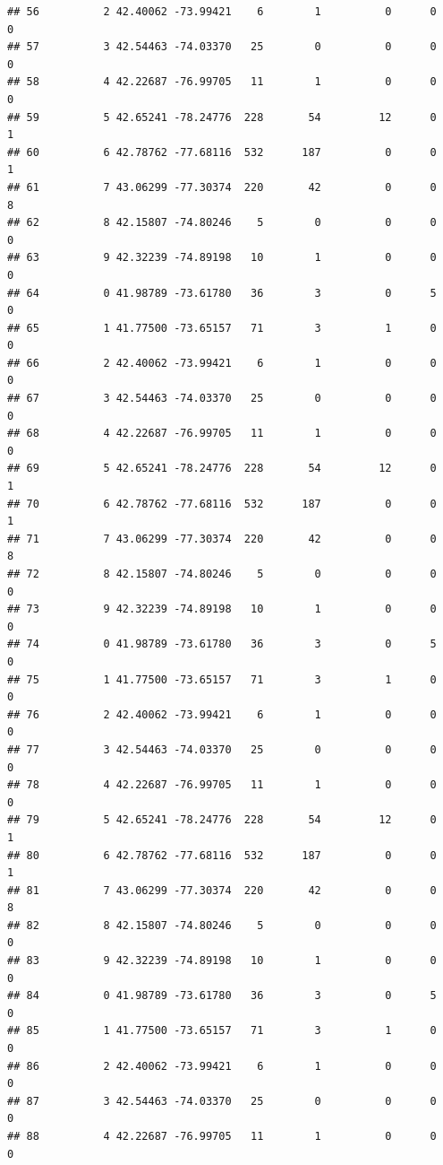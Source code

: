 \documentclass[
]{article}
\begin{document}
\begin{verbatim}
## 56          2 42.40062 -73.99421    6        1          0      0            0
## 57          3 42.54463 -74.03370   25        0          0      0            0
## 58          4 42.22687 -76.99705   11        1          0      0            0
## 59          5 42.65241 -78.24776  228       54         12      0            1
## 60          6 42.78762 -77.68116  532      187          0      0            1
## 61          7 43.06299 -77.30374  220       42          0      0            8
## 62          8 42.15807 -74.80246    5        0          0      0            0
## 63          9 42.32239 -74.89198   10        1          0      0            0
## 64          0 41.98789 -73.61780   36        3          0      5            0
## 65          1 41.77500 -73.65157   71        3          1      0            0
## 66          2 42.40062 -73.99421    6        1          0      0            0
## 67          3 42.54463 -74.03370   25        0          0      0            0
## 68          4 42.22687 -76.99705   11        1          0      0            0
## 69          5 42.65241 -78.24776  228       54         12      0            1
## 70          6 42.78762 -77.68116  532      187          0      0            1
## 71          7 43.06299 -77.30374  220       42          0      0            8
## 72          8 42.15807 -74.80246    5        0          0      0            0
## 73          9 42.32239 -74.89198   10        1          0      0            0
## 74          0 41.98789 -73.61780   36        3          0      5            0
## 75          1 41.77500 -73.65157   71        3          1      0            0
## 76          2 42.40062 -73.99421    6        1          0      0            0
## 77          3 42.54463 -74.03370   25        0          0      0            0
## 78          4 42.22687 -76.99705   11        1          0      0            0
## 79          5 42.65241 -78.24776  228       54         12      0            1
## 80          6 42.78762 -77.68116  532      187          0      0            1
## 81          7 43.06299 -77.30374  220       42          0      0            8
## 82          8 42.15807 -74.80246    5        0          0      0            0
## 83          9 42.32239 -74.89198   10        1          0      0            0
## 84          0 41.98789 -73.61780   36        3          0      5            0
## 85          1 41.77500 -73.65157   71        3          1      0            0
## 86          2 42.40062 -73.99421    6        1          0      0            0
## 87          3 42.54463 -74.03370   25        0          0      0            0
## 88          4 42.22687 -76.99705   11        1          0      0            0

\end{verbatim}
\end{document}
